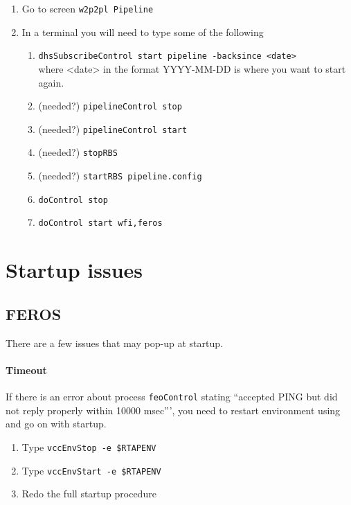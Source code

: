 \documentclass[11pt,fleqn,a4paper]{book}
\begin{document}
\label{proc:DHrestart}
\begin{enumerate} 
    \item Go to screen \texttt{\gls{w2p2pl} Pipeline}
    \item In a terminal you will need to type some of the following
        \begin{enumerate}
            \item \texttt{dhsSubscribeControl start pipeline -backsince <date>}\\where <date> in the format YYYY-MM-DD is where you want to start again.
            \item (needed?) \texttt{pipelineControl stop}
            \item (needed?) \texttt{pipelineControl start}
            \item (needed?) \texttt{stopRBS}
            \item (needed?) \texttt{startRBS pipeline.config}
            \item \texttt{doControl stop}
            \item \texttt{doControl start wfi,feros}
        \end{enumerate}
\end{enumerate}

\newpage
\section{Startup issues}

\subsection{FEROS}
\label{sec:ferosstartuptimeout}

There are a few issues that may pop-up at startup.

\paragraph{Timeout}

If there is an error about process \texttt{feoControl} stating ``accepted PING but did not reply properly within 10000 msec''', you need to restart environment using  and go on with startup.

\label{proc:restartenv}
\begin{enumerate}
\item Type \texttt{vccEnvStop -e \$RTAPENV}
\item Type \texttt{vccEnvStart -e \$RTAPENV}
\item Redo the full startup procedure
\end{enumerate}
 
\end{document}
